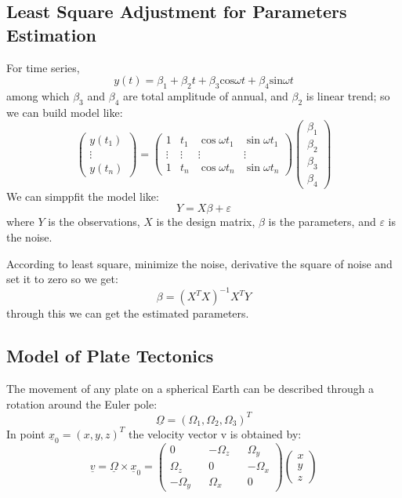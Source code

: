 \documentclass{article}
\begin{document}
\subsection{Least Square Adjustment for Parameters Estimation}
For time series, $$ y(t)=\beta_{1}+\beta_{2}t+\beta_{3}\mathrm{cos}\omega t+\beta_{4}\mathrm{sin}\omega t $$
among which $\beta_3$ and $\beta_4$ are total amplitude of annual, and $\beta_2$ is linear trend; so we can build model like:
$$\begin{pmatrix}y(t_1)\\\vdots\\y(t_n)\end{pmatrix}=\begin{pmatrix}1&t_1&\cos\omega t_1&\sin\omega t_1\\\vdots&\vdots&\vdots&\vdots\\1&t_n&\cos\omega t_n&\sin\omega t_n\end{pmatrix}\begin{pmatrix}\beta_1\\\beta_2\\\beta_3\\\beta_4\end{pmatrix}$$
We can simppfit the model like: $$Y=X\beta+\varepsilon$$
where $Y$ is the observations, $X$ is the design matrix, $\beta$ is the parameters, and $\varepsilon$ is the noise.

According to least square, minimize the noise, 
derivative the square of noise and set it to zero so we get:
$$\beta=(X^TX)^{-1}X^TY$$ through this we can get the estimated parameters.

\subsection{Model of Plate Tectonics}
The movement of any plate on a spherical Earth can be described through a rotation around the Euler pole:
$$\underline{\Omega}=(\Omega_{1},\Omega_{2},\Omega_{3})^{T}$$
In point $\underline{x}_{0}=(x,y,z)^{T}$ the velocity vector v is obtained by:
$$\underline{v}=\underline{\Omega}\times\underline{x}_0=\begin{pmatrix}0&&-\Omega_z&&\Omega_y\\\Omega_z&&0&&-\Omega_x\\-\Omega_y&&\Omega_x&&0\end{pmatrix}\begin{pmatrix}x\\y\\z\end{pmatrix}$$
\end{document}
